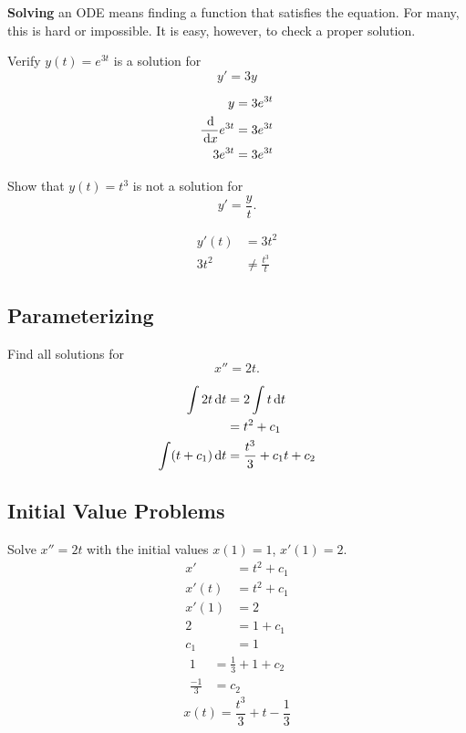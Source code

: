 \textbf{Solving} an ODE means finding a function that satisfies the equation.
For many, this is hard or impossible.
It is easy, however, to check a proper solution.
\begin{ex}
  Verify $y(t)=e^{3t}$ is a solution for
  \[ y'=3y \]
  \begin{sol}
    \begin{align*}
      y&=3e^{3t} \\
      \frac{\,\mathrm{d}}{\,\mathrm{d} x} e^{3t} &=3e^{3t} \\
      3e^{3t} &= 3e^{3t}
    \end{align*}
  \end{sol}
\end{ex}
\begin{ex}
  Show that $y(t)=t^3$ is not a solution for \[y'=\frac{y}{t}.\]
  \begin{sol}
    \begin{align*}
      y'(t)&=3t^2 \\
      3t^2 &\neq \frac{t^3}{t}
    \end{align*}
  \end{sol}
\end{ex}
\subsection{Parameterizing}
\begin{ex}
  Find all solutions for
  \[ x''=2t.\]
  \begin{sol}
    \begin{align*}
      \int 2t \,\mathrm{d} t &= 2 \int t \,\mathrm{d} t \\
      &= t^2 + c_1 \\
      \int (t+c_1) \,\mathrm{d} t &= \frac{t^3}{3}+c_1 t +c_2
    \end{align*}
  \end{sol}
\end{ex}
\subsection{Initial Value Problems}
\begin{ex}
  Solve $x''=2t$ with the initial values $x(1)=1$, $x'(1)=2$.
  \begin{align*}
    x'&= t^2 +c_1 \\
    x'(t) &= t^2 + c_1 \\
    x'(1) &=2 \\
    2&= 1+c_1 \\
    c_1 &=1
  \end{align*}
  \begin{align*}
    1&=\frac{1}{3}+1+c_2 \\
    \frac{-1}{3} &= c_2
  \end{align*}
  \[ x(t) = \frac{t^3}{3}+t-\frac{1}{3} \]
\end{ex}

